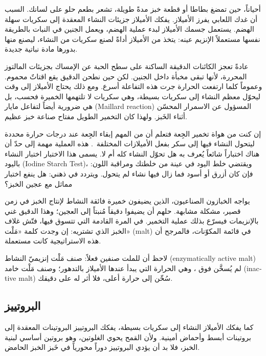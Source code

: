 أحياناً، حين تمضغ بطاطا أو قطعة خبز مدةً طويلة، تشعر بطعم حلو على لسانك. السبب أن غدك اللعابي يفرز الأميلاز. يفكك الأميلاز جزيئات النشاء المعقدة إلى سكريات سهلة الهضم. يستعمل جسمك الأميلاز لبدء عملية الهضم، ويعمل الجنين في النبات بالطريقة نفسها مستعملاً الإنزيم عينه: يتخذ من الأميلاز أداةً لصنع سكريات من النشاء، ليصنع منها بدورها مادة نباتية جديدة.

عادةً تعجز الكائنات الدقيقة الساكنة على سطح الحبة عن الإمساك بجزيئات المالتوز المحررة، لأنها تبقى مخبأة داخل الجنين. لكن حين نطحن الدقيق يقع اقتاتٌ محموم. وعموماً كلما ارتفعت الحرارة جرت هذه التفاعلة أسرع. ومع ذلك يحتاج الأميلاز إلى وقت ليحوّل معظم النشاء إلى سكريات بسيطة، وهي سكريات لا تلتهمها الخميرة فحسب، بل هي ضرورية أيضاً لتفاعل مايار \textenglish{(Maillard reaction)} المسؤول عن الاسمرار المحسّن أثناء الخَبز. ولهذا كان التخمير الطويل مفتاح صناعة خبز عظيم.

إن كنت من هواة تخمير الجِعة فتعلم أن من المهم إبقاء الجِعة عند درجات حرارة محددة ليتحول النشاء فيها إلى سكر بفعل الأميلازات المختلفة~\cite{beer+amylase}. هذه العملية مهمة إلى حدّ أن هناك اختباراً شائعاً يُعرف به هل تحوّل النشاء كله أم لا. يسمى هذا الاختبار اختبار النشاء باليود \textenglish{(Iodine Starch Test)}، ويقتضي خلط اليود في عينة من خلطتك ومراقبة اللون: فإن كان أزرق أو أسود فما زال فيها نشاء لم يتحول. ويتردد في ذهني: هل ينفع اختبار مماثل مع عجين الخبز؟

يواجه الخبازون الصناعيون، الذين يضيفون خميرة فائقة النشاط لإنتاج الخبز في زمن قصير، مشكلة مشابهة. حلهم أن يضيفوا دقيقاً مُنبتاً إلى العجين؛ وهذا الدقيق غني بالإنزيمات فيسرّع بذلك عملية التخمير. في المرة القادمة التي تتسوق فيها، فتّش غلاف الخبز الذي تشتريه: إن وجدت كلمة «مَلْت» \textenglish{(malt)} في قائمة المكوّنات، فالمرجح أن هذه الاستراتيجية كانت مستعملة.

لاحظ أن للملت صنفين فعلاً: صنف مَلْت إنزيميّ النشاط \textenglish{(enzymatically active malt)} لم يُسخَّن فوق ، وهي الحرارة التي يبدأ عندها الأميلاز بالتدهور؛ وصنف مَلْت خامد \textenglish{(inactive malt)} سُخّن إلى حرارة أعلى، فلا أثر له على دقيقك.

\subsection{البروتييز}

كما يفكك الأميلاز النشاء إلى سكريات بسيطة، يفكك البروتييز البروتينات المعقدة إلى بروتينات أبسط وأحماض أمينية. ولأن القمح يحوي الغلوتين، وهو بروتين أساسي لبنية الخبز، فلا بد أن يؤدي البروتييز دوراً محورياً في خَبز الخبز الحامض.

